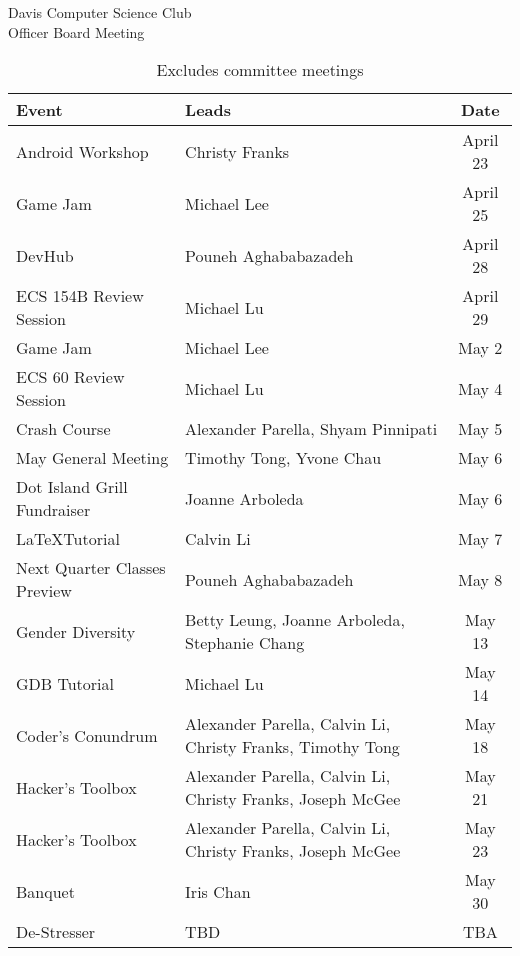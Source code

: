 \documentclass{article}
\begin{document}
\begin{Minutes}{Davis Computer Science Club\\Officer Board Meeting}
\begin{table}[h]
	\centering
	\renewcommand*{\arraystretch}{1.5}
	\begin{tabular}{l l c}
		Event
			&	Leads
			&	Date\\
		\hline
		Android Workshop
			&	Christy Franks
			&	April 23\\
		Game Jam
			&	Michael Lee
			&	April 25\\
		DevHub
			&	Pouneh Aghababazadeh
			&	April 28\\
		ECS 154B Review Session
			&	Michael Lu
			&	April 29\\
		Game Jam
			&	Michael Lee
			&	May 2\\
		ECS 60 Review Session
			&	Michael Lu
			&	May 4\\
		Crash Course
			&	Alexander Parella, Shyam Pinnipati
			&	May 5\\
		May General Meeting
			&	Timothy Tong, Yvone Chau
			&	May 6\\
		Dot Island Grill Fundraiser
			&	Joanne Arboleda
			&	May 6\\
		\LaTeX Tutorial
			&	Calvin Li
			&	May 7\\
		Next Quarter Classes Preview
			&	Pouneh Aghababazadeh
			&	May 8\\
		Gender Diversity	
			&	Betty Leung, Joanne Arboleda, Stephanie Chang
			&	May 13\\
		GDB Tutorial
			&	Michael Lu
			&	May 14\\
		Coder's Conundrum	
			&	Alexander Parella, Calvin Li, Christy Franks, Timothy Tong
			&	May 18\\
		Hacker's Toolbox
			&	Alexander Parella, Calvin Li, Christy Franks, Joseph McGee
			&	May 21\\
		Hacker's Toolbox
			&	Alexander Parella, Calvin Li, Christy Franks, Joseph McGee
			&	May 23\\
		Banquet
			&	Iris Chan
			&	May 30\\
		De-Stresser
			&	TBD
			&	TBA\\
	\end{tabular}
	\caption*{Excludes committee meetings}
\end{table}


\end{Minutes}
\end{document}
